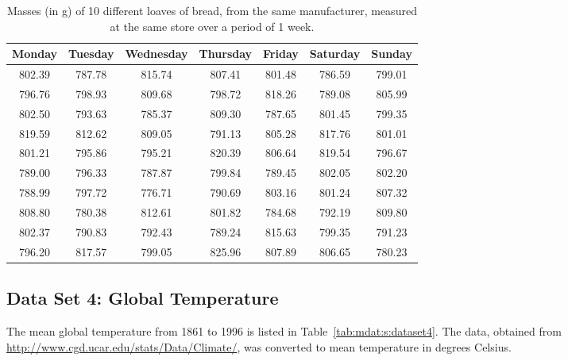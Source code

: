 \documentclass[10pt,a4paper,titlepage,twoside,openright]{report}
\begin{document}
\begin{table}[htb!]
\begin{center}
\begin{tabular}{|c|c|c|c|c|c|c|}\hline
Monday & Tuesday & Wednesday & Thursday & Friday & Saturday & Sunday\\\hline\hline
802.39 & 787.78 & 815.74 & 807.41 & 801.48 & 786.59 & 799.01\\\hline
796.76 & 798.93 & 809.68 & 798.72 & 818.26 & 789.08 & 805.99\\\hline
802.50 & 793.63 & 785.37 & 809.30 & 787.65 & 801.45 & 799.35\\\hline
819.59 & 812.62 & 809.05 & 791.13 & 805.28 & 817.76 & 801.01\\\hline
801.21 & 795.86 & 795.21 & 820.39 & 806.64 & 819.54 & 796.67\\\hline
789.00 & 796.33 & 787.87 & 799.84 & 789.45 & 802.05 & 802.20\\\hline
788.99 & 797.72 & 776.71 & 790.69 & 803.16 & 801.24 & 807.32\\\hline
808.80 & 780.38 & 812.61 & 801.82 & 784.68 & 792.19 & 809.80\\\hline
802.37 & 790.83 & 792.43 & 789.24 & 815.63 & 799.35 & 791.23\\\hline
796.20 & 817.57 & 799.05 & 825.96 & 807.89 & 806.65 & 780.23\\\hline
\end{tabular}
\end{center}
\caption{Masses (in g) of 10 different loaves of bread, from the same manufacturer, measured at the same store over a period of 1 week.}
\label{tab:mdat:s:dataset3}
\end{table}

\subsection{Data Set 4: Global Temperature}
\label{mdat:s:ed:dataset4}

The mean global temperature from 1861 to 1996 is listed in Table~\ref{tab:mdat:s:dataset4}. The data, obtained from \url{http://www.cgd.ucar.edu/stats/Data/Climate/}, was converted to mean temperature in degrees Celsius.

\end{document}
